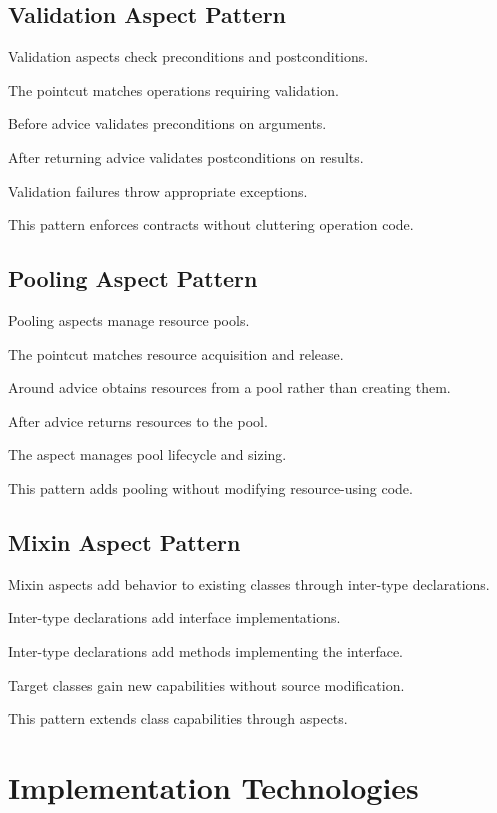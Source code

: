 \documentclass[11pt]{article}
\begin{document}
\subsection{Validation Aspect Pattern}

Validation aspects check preconditions and postconditions.

The pointcut matches operations requiring validation.

Before advice validates preconditions on arguments.

After returning advice validates postconditions on results.

Validation failures throw appropriate exceptions.

This pattern enforces contracts without cluttering operation code.

\subsection{Pooling Aspect Pattern}

Pooling aspects manage resource pools.

The pointcut matches resource acquisition and release.

Around advice obtains resources from a pool rather than creating them.

After advice returns resources to the pool.

The aspect manages pool lifecycle and sizing.

This pattern adds pooling without modifying resource-using code.

\subsection{Mixin Aspect Pattern}

Mixin aspects add behavior to existing classes through inter-type declarations.

Inter-type declarations add interface implementations.

Inter-type declarations add methods implementing the interface.

Target classes gain new capabilities without source modification.

This pattern extends class capabilities through aspects.

\section{Implementation Technologies}
\end{document}
